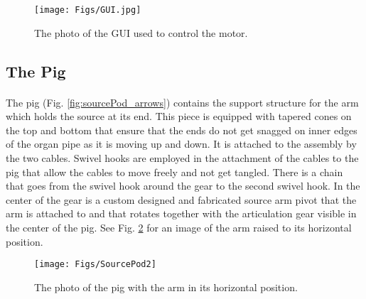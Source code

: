 \begin{figure}[htbp]
 \centering
  \texttt{[image: Figs/GUI.jpg]}
  \caption{The photo of the GUI used to control the motor.}
  \label{fig:GUI}
\end{figure}	
	
 \subsection{The Pig} \label{The Pig}
 \paragraph{}
The pig (Fig. \ref{fig:sourcePod_arrows}) contains the support structure for the arm which holds the source at its end.  This piece is equipped with tapered cones on the top and bottom that ensure that the ends do not get snagged on inner edges of the organ pipe as it is moving up and down. It is attached to the assembly by the two cables.  Swivel hooks are employed in the attachment of the cables to the pig that allow the cables to move freely and not get tangled.  There is a chain that goes from the swivel hook around the gear to the second swivel hook. In the center of the gear is a custom designed and fabricated source arm pivot that the arm is attached to and that rotates together with the articulation gear visible in the center of the pig. See Fig. \ref{fig:SourcePod2} for an image of the arm raised to its horizontal position.  
 
\begin{figure}[htbp]
 \centering
  \texttt{[image: Figs/SourcePod2]}
  \caption{The photo of the pig with the arm in its horizontal position.}
  \label{fig:SourcePod2}
\end{figure}

